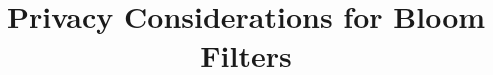 %




\title{Privacy Considerations for Bloom Filters}
\date{}

\maketitle


\begin{abstract}
%
\end{abstract}


%

%
%



